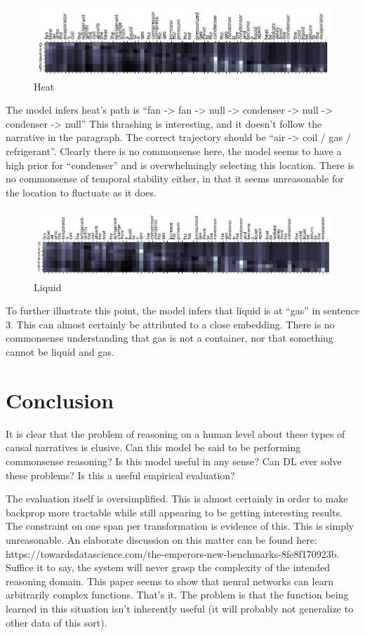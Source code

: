 \documentclass[11pt,a4paper]{article}
\begin{document}
\begin{figure}[h]
  \includegraphics[width=\linewidth]{images/heat.png}
  \caption{Heat}
  \label{fig:boat1}
\end{figure}

The model infers heat’s path is “fan -> fan -> null -> condenser -> null -> condenser -> null”
This thrashing is interesting, and it doesn’t follow the narrative in the paragraph. The correct trajectory should be “air -> coil / gas / refrigerant”. Clearly there is no commonsense here, the model seems to have a high prior for “condenser” and is overwhelmingly selecting this location. There is no commonsense of temporal stability either, in that it seems unreasonable for the location to fluctuate as it does. 


\begin{figure}[h]
  \includegraphics[width=\linewidth]{images/liquid.png}
  \caption{Liquid}
  \label{fig:boat1}
\end{figure}

To further illustrate this point, the model infers that liquid is at “gas” in sentence 3. This can almost certainly be attributed to a close embedding. There is no commonsense understanding that gas is not a container, nor that something cannot be liquid and gas.

\section{Conclusion}

It is clear that the problem of reasoning on a human level about these types of causal narratives is elusive. Can this model be said to be performing commonsense reasoning? Is this model useful in any sense? Can DL ever solve these problems? Is this a useful empirical evaluation?

The evaluation itself is oversimplified. This is almost certainly in order to make backprop more tractable while still appearing to be getting interesting results. The constraint on one span per transformation is evidence of this. This is simply unreasonable. An elaborate discussion on this matter can be found here: https://towardsdatascience.com/the-emperors-new-benchmarks-8fe8f170923b.
Suffice it to say, the system will never grasp the complexity of the intended reasoning domain. This paper seems to show that neural networks can learn arbitrarily complex functions. That’s it. The problem is that the function being learned in this situation isn’t inherently useful (it will probably not generalize to other data of this sort).
\end{document}
